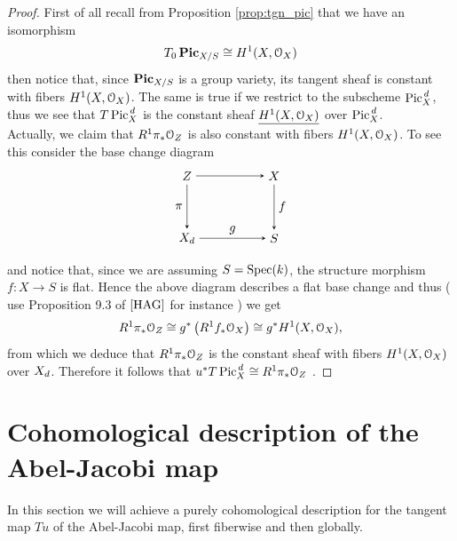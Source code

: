 	\begin{proof}
		First of all recall from Proposition \ref{prop:tgn_pic} that we have an isomorphism
		$$ T_0 \operatorname{\mathbf{Pic}}_{X/S} \cong H^1(X, \mathcal{O}_X)$$
		then notice that, since $\operatorname{\mathbf{Pic}}_{X/S}$ is a group variety, its tangent sheaf is constant with fibers $H^1(X, \mathcal{O}_X)$. The same is true if we restrict to the subscheme $\operatorname{Pic}^{\,d}_X$, thus we see that $ T \operatorname{Pic}^{\,d}_X $ is the constant sheaf $\underline{H^1(X,\mathcal{O}_X)}$ over $\operatorname{Pic}^{\,d}_X$. \\

		Actually, we claim that $R^1 \pi_* \mathcal{O}_{Z}$ is also constant with fibers $H^1(X, \mathcal{O}_X)$. To see this consider the base change diagram
		$$
		\begin{tikzpicture}[node distance=5em, auto]
			\node (A) 															{$Z$};
			\node (B) 	[right of=A, xshift=2em]		{$X$};
		  \node (C) 	[below of=A] 								{$\Dd$};
		  \node (D) 	[right of=C, xshift=2em] 		{$S$};
		  \draw[-stealth]					(A)		to node {} (B);
		  \draw[-stealth][swap]		(A)		to node {$\pi$} (C);
		  \draw[-stealth]					(B)		to node {$f$} (D);
		  \draw[-stealth]					(C)		to node {$g$} (D);
		\end{tikzpicture}
		$$
		and notice that, since we are assuming $S=\operatorname{Spec}(k)$, the structure morphism $f:X\to S$ is flat. Hence the above diagram describes a flat base change and thus ( use Proposition 9.3 of $\cite{HAG}$ for instance ) we get
		$$ R^1 \pi_*\mathcal{O}_{Z} \cong g^* \left( R^1f_*\mathcal{O}_X \right) \cong  g^* H^1(X,\mathcal{O}_X), $$
		from which we deduce that $R^1\pi_* \mathcal{O}_{Z}$ is the constant sheaf with fibers $H^1(X,\mathcal{O}_X)$ over $X_d$. Therefore it follows that $ u^* T \operatorname{Pic}^{\,d}_X \cong R^1 \pi_* \mathcal{O}_{Z} $ .
 	\end{proof}

\section{Cohomological description of the Abel-Jacobi map}
	In this section we will achieve a purely cohomological description for the tangent map $Tu$ of the Abel-Jacobi map, first fiberwise and then globally.
